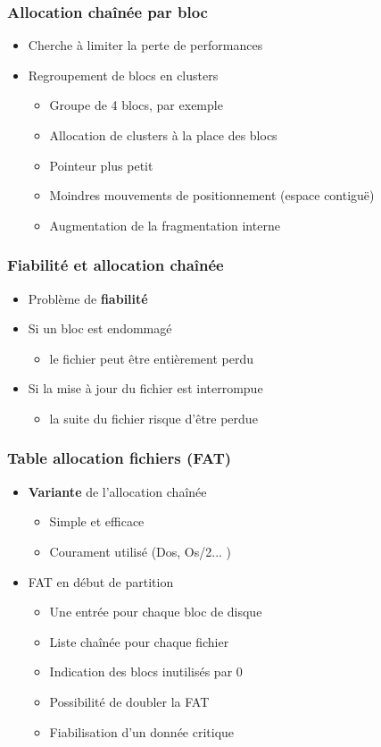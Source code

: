 \begin{frame}
\frametitle{Allocation chaînée par bloc}
\begin{itemize}
\item Cherche à limiter la perte de performances
\item Regroupement de blocs en clusters
\begin{itemize}
\item Groupe de 4 blocs, par exemple
\item Allocation de clusters à la place des blocs
\item Pointeur plus petit
\item Moindres mouvements de positionnement (espace contiguë)
\item Augmentation de la fragmentation interne
\end{itemize}
\end{itemize}
\end{frame}

\begin{frame}
\frametitle{Fiabilité et allocation chaînée}
\begin{itemize}
\item Problème de \textbf{fiabilité}
\item Si un bloc est endommagé
\begin{itemize}
\item le fichier peut être entièrement perdu
\end{itemize}
\item Si la mise à jour du fichier est interrompue
\begin{itemize}
\item la suite du fichier risque d'être perdue 
\end{itemize}
\end{itemize}
\end{frame}

\begin{frame}
\frametitle{Table allocation fichiers (FAT)}
\begin{itemize}
\item \textbf{Variante} de l'allocation chaînée
\begin{itemize}
\item Simple et efficace
\item Courament utilisé (Dos, Os/2... )
\end{itemize}
\item FAT en début de partition
\begin{itemize}
\item Une entrée pour chaque bloc de disque
\item Liste chaînée pour chaque fichier
\item Indication des blocs inutilisés par 0
\item Possibilité de doubler la FAT
\item Fiabilisation d'un donnée critique\textbf{}
\end{itemize}
\end{itemize}
\end{frame}

